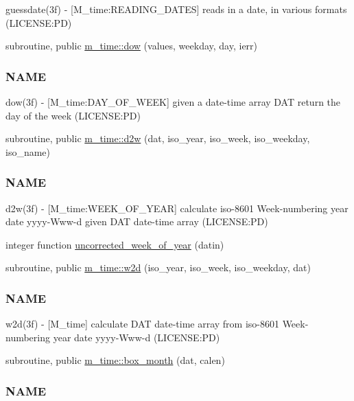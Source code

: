 \begin{DoxyCompactItemize}
\begin{DoxyCompactList}
guessdate(3f) -\/ \mbox{[}M\+\_\+time\+:R\+E\+A\+D\+I\+N\+G\+\_\+\+D\+A\+T\+ES\mbox{]} reads in a date, in various formats (L\+I\+C\+E\+N\+SE\+:PD) \end{DoxyCompactList}\item 
subroutine, public \mbox{\hyperlink{namespacem__time_adfda8a89820b8d0ad4581a14896e4ce5}{m\+\_\+time\+::dow}} (values, weekday, day, ierr)
\begin{DoxyCompactList}\small\item\em \subsubsection*{N\+A\+ME}

dow(3f) -\/ \mbox{[}M\+\_\+time\+:D\+A\+Y\+\_\+\+O\+F\+\_\+\+W\+E\+EK\mbox{]} given a date-\/time array D\+AT return the day of the week (L\+I\+C\+E\+N\+SE\+:PD) \end{DoxyCompactList}\item 
subroutine, public \mbox{\hyperlink{namespacem__time_ad4ff99ad6f6d5282c4b65ad636a2a627}{m\+\_\+time\+::d2w}} (dat, iso\+\_\+year, iso\+\_\+week, iso\+\_\+weekday, iso\+\_\+name)
\begin{DoxyCompactList}\small\item\em \subsubsection*{N\+A\+ME}

d2w(3f) -\/ \mbox{[}M\+\_\+time\+:W\+E\+E\+K\+\_\+\+O\+F\+\_\+\+Y\+E\+AR\mbox{]} calculate iso-\/8601 Week-\/numbering year date yyyy-\/\+Www-\/d given D\+AT date-\/time array (L\+I\+C\+E\+N\+SE\+:PD) \end{DoxyCompactList}\item 
integer function \mbox{\hyperlink{M__time_8f90_a4a68c5e906616f64da0c3d165fc41479}{uncorrected\+\_\+week\+\_\+of\+\_\+year}} (datin)
\item 
subroutine, public \mbox{\hyperlink{namespacem__time_ac0ec48db8d508bfa23fe4b20c9d1c5a3}{m\+\_\+time\+::w2d}} (iso\+\_\+year, iso\+\_\+week, iso\+\_\+weekday, dat)
\begin{DoxyCompactList}\small\item\em \subsubsection*{N\+A\+ME}

w2d(3f) -\/ \mbox{[}M\+\_\+time\mbox{]} calculate D\+AT date-\/time array from iso-\/8601 Week-\/numbering year date yyyy-\/\+Www-\/d (L\+I\+C\+E\+N\+SE\+:PD) \end{DoxyCompactList}\item 
subroutine, public \mbox{\hyperlink{namespacem__time_a0fe7540912df30d3578f3c469413aea8}{m\+\_\+time\+::box\+\_\+month}} (dat, calen)
\begin{DoxyCompactList}\small\item\em \subsubsection*{N\+A\+ME}


\end{DoxyCompactList}
\end{DoxyCompactItemize}
